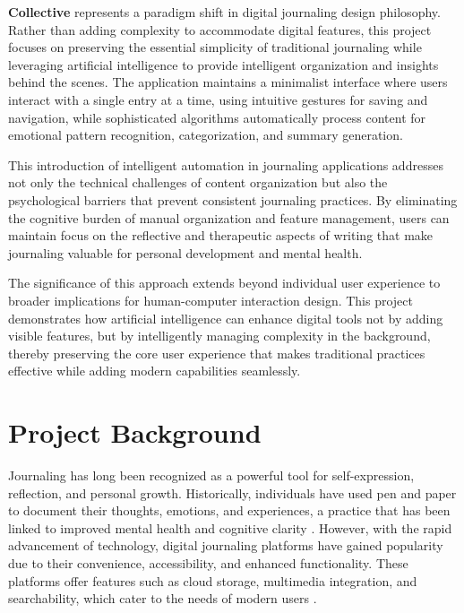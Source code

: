 \textbf{Collective} represents a paradigm shift in digital journaling design philosophy. Rather than adding complexity to accommodate digital features, this project focuses on preserving the essential simplicity of traditional journaling while leveraging artificial intelligence to provide intelligent organization and insights behind the scenes. The application maintains a minimalist interface where users interact with a single entry at a time, using intuitive gestures for saving and navigation, while sophisticated algorithms automatically process content for emotional pattern recognition, categorization, and summary generation.

This introduction of intelligent automation in journaling applications addresses not only the technical challenges of content organization but also the psychological barriers that prevent consistent journaling practices. By eliminating the cognitive burden of manual organization and feature management, users can maintain focus on the reflective and therapeutic aspects of writing that make journaling valuable for personal development and mental health.

The significance of this approach extends beyond individual user experience to broader implications for human-computer interaction design. This project demonstrates how artificial intelligence can enhance digital tools not by adding visible features, but by intelligently managing complexity in the background, thereby preserving the core user experience that makes traditional practices effective while adding modern capabilities seamlessly.

\section{Project Background}\label{sec:background}

Journaling has long been recognized as a powerful tool for self-expression, reflection, and personal growth. Historically, individuals have used pen and paper to document their thoughts, emotions, and experiences, a practice that has been linked to improved mental health and cognitive clarity \cite{pennebaker1999forming}. However, with the rapid advancement of technology, digital journaling platforms have gained popularity due to their convenience, accessibility, and enhanced functionality. These platforms offer features such as cloud storage, multimedia integration, and searchability, which cater to the needs of modern users \cite{sloan2015efficacy}.

